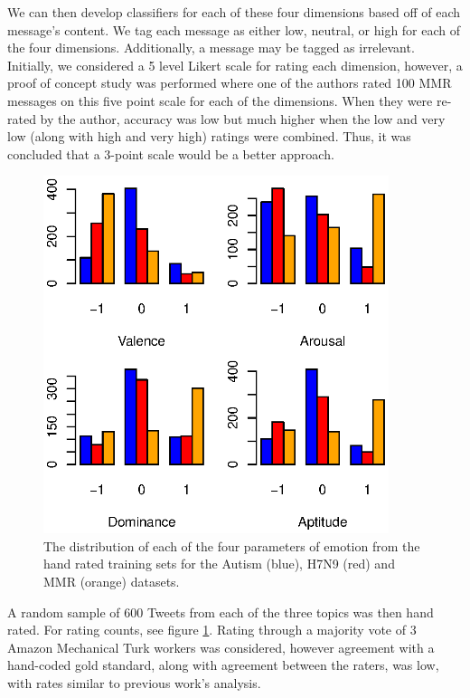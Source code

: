 We can then develop classifiers for each of these four dimensions based off of each message's content. We tag each message as either low, neutral, or high for each of the four dimensions. Additionally, a message may be tagged as irrelevant. Initially, we considered a 5 level Likert scale for rating each dimension, however, a proof of concept study was performed where one of the authors rated 100 MMR messages on this five point scale for each of the dimensions. When they were re-rated by the author, accuracy was low but much higher when the low and very low (along with high and very high) ratings were combined. Thus, it was concluded that a 3-point scale would be a better approach. 

\begin{figure}
\centering
\includegraphics[width=0.9\textwidth]{retweets/figures/emotiondistribution.eps}
\caption{The distribution of each of the four parameters of emotion from the hand rated training sets for the Autism (blue), H7N9 (red) and MMR (orange) datasets.}
\label{fig:emodist}
\end{figure}


A random sample of 600 Tweets from each of the three topics was then hand rated. For rating counts, see figure \ref{fig:emodist}. Rating through a majority vote of 3 Amazon Mechanical Turk workers was considered, however agreement with a hand-coded gold standard, along with agreement between the raters, was low, with rates similar to previous work's analysis\cite{snow2008cheap}.  

